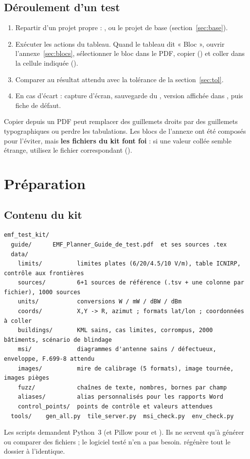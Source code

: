 \subsection{Déroulement d'un test}
\begin{enumerate}
\item Repartir d'un projet propre : , ou le projet de base  (section~\ref{sec:base}).
\item Exécuter les actions du tableau. Quand le tableau dit « Bloc  », ouvrir l'annexe~\ref{sec:blocs}, sélectionner le bloc dans le PDF, copier () et coller dans la cellule indiquée ().
\item Comparer au résultat attendu avec la tolérance de la section~\ref{sec:tol}.
\item En cas d'écart : capture d'écran, sauvegarde du , version affichée dans , puis fiche de défaut.
\end{enumerate}
\begin{alerte}Copier depuis un PDF peut remplacer des guillemets droits par des guillemets typographiques ou perdre les tabulations. Les blocs de l'annexe ont été composés pour l'éviter, mais \textbf{les fichiers du kit font foi} : si une valeur collée semble étrange, utilisez le fichier correspondant ().\end{alerte}

\section{Préparation}
\subsection{Contenu du kit}
\begin{Verbatim}[fontsize=\footnotesize,frame=single,framesep=2mm,rulecolor=\color{accent}]
emf_test_kit/
  guide/      EMF_Planner_Guide_de_test.pdf  et ses sources .tex
  data/
    limits/          limites plates (6/20/4.5/10 V/m), table ICNIRP, contrôle aux frontières
    sources/         6+1 sources de référence (.tsv + une colonne par fichier), 1000 sources
    units/           conversions W / mW / dBW / dBm
    coords/          X,Y -> R, azimut ; formats lat/lon ; coordonnées à coller
    buildings/       KML sains, cas limites, corrompus, 2000 bâtiments, scénario de blindage
    msi/             diagrammes d'antenne sains / défectueux, enveloppe, F.699-8 attendu
    images/          mire de calibrage (5 formats), image tournée, images pièges
    fuzz/            chaînes de texte, nombres, bornes par champ
    aliases/         alias personnalisés pour les rapports Word
    control_points/  points de contrôle et valeurs attendues
  tools/    gen_all.py  tile_server.py  msi_check.py  env_check.py
\end{Verbatim}
Les scripts demandent Python~3 (et Pillow pour  et ). Ils ne servent qu'à générer ou comparer des fichiers ; le logiciel testé n'en a pas besoin.  régénère tout le dossier  à l'identique.

